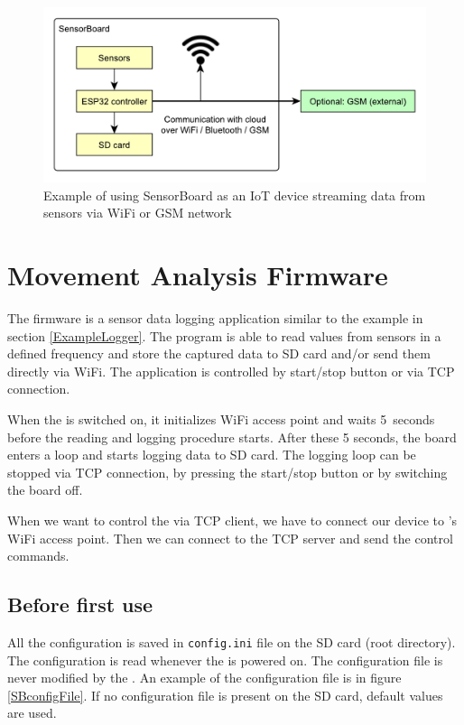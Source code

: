 \begin{figure}
    \centering
    \caption{Example of using SensorBoard as an \ac{IoT} device streaming data from sensors via WiFi or GSM network}
    \label{UEIoT}
    \includegraphics[width=\linewidth]{img/UsageExamplesIoT.pdf}
\end{figure}

\section{Movement Analysis Firmware}
\label{HorseFirmware}
The firmware is a sensor data logging application similar to the example in section \ref{ExampleLogger}. The program is able to read values from sensors in a defined frequency and store the captured data to SD card and/or send them directly via WiFi. The application is controlled by start/stop button or via \ac{TCP} connection.

When the  is switched on, it initializes WiFi access point and waits 5~seconds before the reading and logging procedure starts. After these 5 seconds, the board enters a loop and starts logging data to SD card. The logging loop can be stopped via \ac{TCP} connection, by pressing the start/stop button or by switching the board off.

When we want to control the  via \ac{TCP} client, we have to connect our device to 's WiFi access point. Then we can connect to the \ac{TCP} server and send the control commands.

\subsection{Before first use}
\label{beforeFirstUse}
All the configuration is saved in \texttt{config.ini} file on the SD card (root directory). The configuration is read whenever the  is powered on. The configuration file is never modified by the . An example of the configuration file is in figure \ref{SBconfigFile}. If no configuration file is present on the SD card, default values are used.

